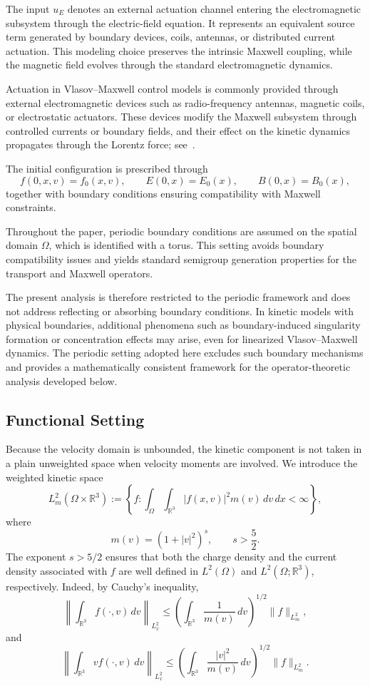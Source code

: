 \documentclass[AMA,Times2COL]{WileyNJDv5}
\begin{document}
The input $u_E$ denotes an external actuation channel entering the electromagnetic subsystem through the electric-field equation. It represents an
equivalent source term generated by boundary devices, coils, antennas, or distributed current actuation. This modeling choice preserves the intrinsic
Maxwell coupling, while the magnetic field evolves through the standard electromagnetic dynamics.

\medskip
Actuation in Vlasov--Maxwell control models is commonly provided through external electromagnetic devices such as radio-frequency antennas, magnetic coils, or electrostatic actuators.
These devices modify the Maxwell subsystem through controlled currents or boundary fields, and their effect on the kinetic dynamics propagates through the Lorentz force; see~\cite{svidzinski2024full,zaar2025enhanced}.

\medskip
The initial configuration is prescribed through
\[
f(0,x,v)=f_0(x,v),\qquad
E(0,x)=E_0(x),\qquad
B(0,x)=B_0(x),
\]
together with boundary conditions ensuring compatibility with Maxwell constraints.

Throughout the paper, periodic boundary conditions are assumed on the spatial domain $\Omega$, which is identified with a torus. This setting avoids boundary
compatibility issues and yields standard semigroup generation properties for the transport and Maxwell operators.

The present analysis is therefore restricted to the periodic framework and does not address reflecting or absorbing boundary conditions. In kinetic models with physical boundaries, additional phenomena such as boundary-induced singularity formation or concentration effects may arise, even for linearized Vlasov--Maxwell dynamics. The periodic setting adopted here excludes such boundary mechanisms and provides a mathematically consistent framework for the operator-theoretic analysis developed below.

\subsection{Functional Setting}
Because the velocity domain is unbounded, the kinetic component is not taken in a plain unweighted space when velocity moments are involved. We introduce the weighted kinetic space
\[
L^2_m(\Omega\times\mathbb{R}^3)
:=
\left\{
f:\int_{\Omega}\int_{\mathbb{R}^3}
|f(x,v)|^2m(v)\,dv\,dx<\infty
\right\},
\]
where
\[
m(v)=(1+|v|^2)^s,
\qquad s>\frac52.
\]
The exponent $s>5/2$ ensures that both the charge density and the current density associated with $f$ are well defined in $L^2(\Omega)$ and $L^2(\Omega;\mathbb R^3)$, respectively. Indeed, by Cauchy's inequality,
\[
\left\|\int_{\mathbb R^3} f(\cdot,v)\,dv\right\|_{L^2_x}
\le
\left(\int_{\mathbb R^3}\frac{1}{m(v)}\,dv\right)^{1/2}
\|f\|_{L^2_m},
\]
and
\[
\left\|\int_{\mathbb R^3} v f(\cdot,v)\,dv\right\|_{L^2_x}
\le
\left(\int_{\mathbb R^3}\frac{|v|^2}{m(v)}\,dv\right)^{1/2}
\|f\|_{L^2_m}.
\]
\end{document}

